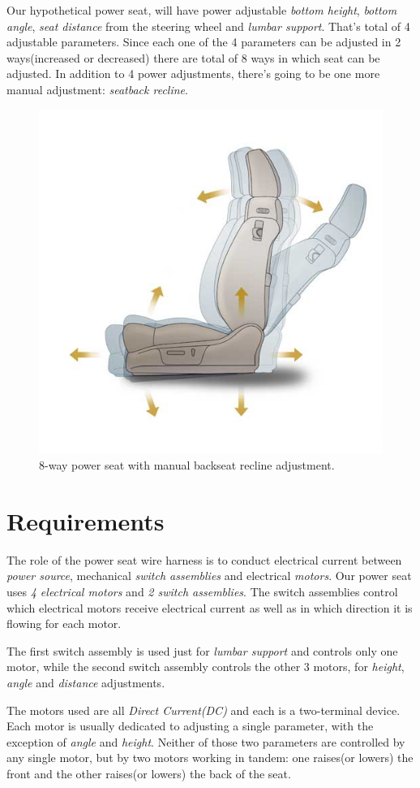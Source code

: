 \documentclass[12pt,letterpaper]{article}
\begin{document}
Our hypothetical power seat, will have power adjustable \textit{bottom height}, \textit{bottom angle}, \textit{seat distance} from the steering wheel and \textit{lumbar support}. That’s total of 4 adjustable parameters. Since each one of the 4 parameters can be adjusted in 2 ways(increased or decreased) there are total of 8 ways in which seat can be adjusted. In addition to 4 power adjustments, there’s going to be one more manual adjustment: \textit{seatback recline}.
\begin{figure}[b!]
  \centering
  \includegraphics[width=0.70\linewidth]{8-way-seat.jpg}
  \caption{8-way power seat with manual backseat recline adjustment.}
  \label{fig:wireharness1}
\end{figure}
\newpage
{}
\section{Requirements}
The role of the power seat wire harness is to conduct electrical current between \textit{power source}, mechanical \textit{switch assemblies} and electrical \textit{motors}. Our power seat uses \textit{4 electrical motors} and \textit{2 switch assemblies}. The switch assemblies control which electrical motors receive electrical current as well as in which direction it is flowing for each motor.

The first switch assembly is used just for \textit{lumbar support} and controls only one motor, while the second switch assembly controls the other 3 motors, for \textit{height}, \textit{angle} and \textit{distance} adjustments.

The motors used are all \textit{Direct Current(DC)} and each is a two-terminal device. Each motor is usually dedicated to adjusting a single parameter, with the exception of \textit{angle} and \textit{height}. Neither of those two parameters are controlled by any single motor, but by two motors working in tandem: one raises(or lowers) the front and the other raises(or lowers) the back of the seat.
\end{document}
